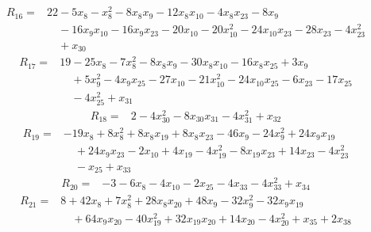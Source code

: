 \begin{equation*}\begin{split}
R_{16}={}&22 - 5x_{8} - x_{8}^{2} - 8x_{8} x_{9} - 12x_{8} x_{10} - 4x_{8} x_{23} - 8x_{9}\\
&\quad -16x_{9} x_{10} - 16x_{9} x_{23} - 20x_{10} - 20x_{10}^{2} - 24x_{10} x_{23} - 28x_{23} - 4x_{23}^{2}\\
&\quad + x_{30}
\end{split}\end{equation*}
\begin{equation*}\begin{split}
R_{17}={}&19 - 25x_{8} - 7x_{8}^{2} - 8x_{8} x_{9} - 30x_{8} x_{10} - 16x_{8} x_{25} + 3x_{9}\\
&\quad + 5x_{9}^{2} - 4x_{9} x_{25} - 27x_{10} - 21x_{10}^{2} - 24x_{10} x_{25} - 6x_{23} - 17x_{25}\\
&\quad -4x_{25}^{2} + x_{31}
\end{split}\end{equation*}
\begin{equation*}\begin{split}
R_{18}={}&2 - 4x_{30}^{2} - 8x_{30} x_{31} - 4x_{31}^{2} + x_{32}
\end{split}\end{equation*}
\begin{equation*}\begin{split}
R_{19}={}&-19x_{8} + 8x_{8}^{2} + 8x_{8} x_{19} + 8x_{8} x_{23} - 46x_{9} - 24x_{9}^{2} + 24x_{9} x_{19}\\
&\quad + 24x_{9} x_{23} - 2x_{10} + 4x_{19} - 4x_{19}^{2} - 8x_{19} x_{23} + 14x_{23} - 4x_{23}^{2}\\
&\quad -x_{25} + x_{33}
\end{split}\end{equation*}
\begin{equation*}\begin{split}
R_{20}={}&-3 - 6x_{8} - 4x_{10} - 2x_{25} - 4x_{33} - 4x_{33}^{2} + x_{34}
\end{split}\end{equation*}
\begin{equation*}\begin{split}
R_{21}={}&8 + 42x_{8} + 7x_{8}^{2} + 28x_{8} x_{20} + 48x_{9} - 32x_{9}^{2} - 32x_{9} x_{19}\\
&\quad + 64x_{9} x_{20} - 40x_{19}^{2} + 32x_{19} x_{20} + 14x_{20} - 4x_{20}^{2} + x_{35} + 2x_{38}
\end{split}\end{equation*}

